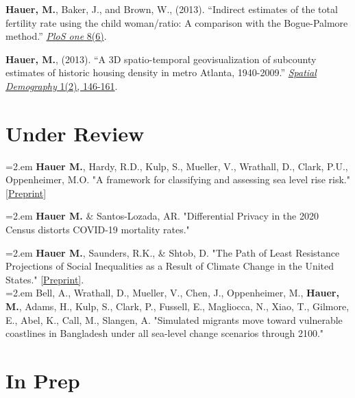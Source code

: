 \begin{etaremune}
\item \textbf{Hauer, M.}, Baker, J., and Brown, W., (2013). ``Indirect estimates of the total fertility rate using the child                        woman/ratio: A comparison with the Bogue-Palmore method.'' \href{http://journals.plos.org/plosone/article?id=10.1371/journal.pone.0067226}{\textit{PloS one} 8(6)}.\\

\item \textbf{Hauer, M.}, (2013). ``A 3D spatio-temporal geovisualization of subcounty estimates of historic housing density in metro Atlanta, 1940-2009.'' \href{http://link.springer.com/article/10.1007/BF03354895}{\textit{Spatial Demography} 1(2), 146-161}.\\

 \end{etaremune}


\section{Under Review}

\hangindent=2.em \textbf{Hauer M.}, Hardy, R.D., Kulp, S., Mueller, V., Wrathall, D., Clark, P.U., Oppenheimer, M.O. "A framework for classifying and assessing sea level rise risk." \href{https://osf.io/preprints/socarxiv/tf6rj/}{[Preprint]}

\hangindent=2.em \textbf{Hauer M.} \& Santos-Lozada, AR. "Differential Privacy in the 2020 Census distorts COVID-19 mortality rates."

 \hangindent=2.em \textbf{Hauer M.}, Saunders, R.K., \& Shtob, D. "The Path of Least Resistance Projections of Social Inequalities as a Result of Climate Change in the United States." \href{https://osf.io/preprints/socarxiv/7jtrn/}{[Preprint]}. \\

 \hangindent=2.em Bell, A., Wrathall, D., Mueller, V., Chen, J., Oppenheimer, M., \textbf{Hauer, M.}, Adams, H., Kulp, S., Clark, P., Fussell, E., Magliocca, N., Xiao, T., Gilmore, E., Abel, K., Call, M., Slangen, A. "Simulated migrants move toward vulnerable coastlines in Bangladesh under all sea-level change scenarios through 2100."

%
\section{In Prep}


